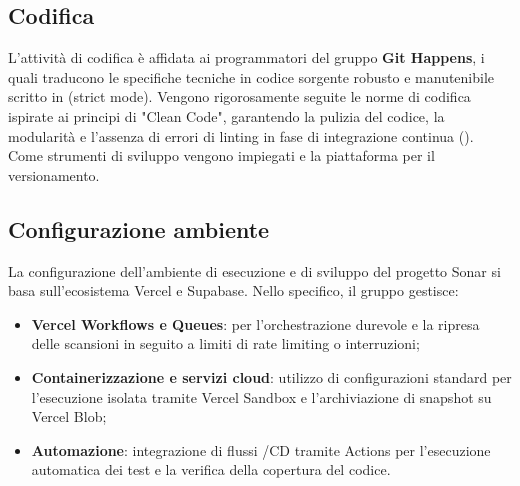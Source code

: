 \subsection{Codifica}
L'attività di codifica è affidata ai programmatori del gruppo \textbf{Git Happens}, i quali traducono le specifiche tecniche in codice sorgente robusto e manutenibile scritto in  (strict mode). Vengono rigorosamente seguite le norme di codifica ispirate ai principi di "Clean Code", garantendo la pulizia del codice, la modularità e l'assenza di errori di linting in fase di integrazione continua (). \\
Come strumenti di sviluppo vengono impiegati  e la piattaforma  per il versionamento.

\subsection{Configurazione ambiente}
La configurazione dell'ambiente di esecuzione e di sviluppo del progetto Sonar si basa sull'ecosistema Vercel e Supabase. Nello specifico, il gruppo gestisce:
\begin{itemize}
    \item \textbf{Vercel Workflows e Queues}: per l'orchestrazione durevole e la ripresa delle scansioni in seguito a limiti di rate limiting o interruzioni;
    \item \textbf{Containerizzazione e servizi cloud}: utilizzo di configurazioni standard per l'esecuzione isolata tramite Vercel Sandbox e l'archiviazione di snapshot su Vercel Blob;
    \item \textbf{Automazione}: integrazione di flussi /CD tramite  Actions per l'esecuzione automatica dei test e la verifica della copertura del codice.
\end{itemize}